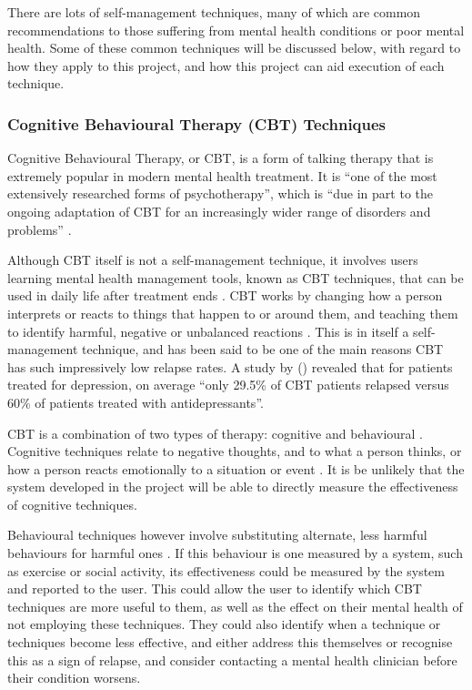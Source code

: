 \documentclass[11pt,openright,a4paper]{report}
\begin{document}
There are lots of self-management techniques, many of which are common recommendations to those suffering from mental health conditions or poor mental health. Some of these common techniques will be discussed below, with regard to how they apply to this project, and how this project can aid execution of each technique.

\subsubsection{Cognitive Behavioural Therapy (CBT) Techniques}
Cognitive Behavioural Therapy, or CBT, is a form of talking therapy that is extremely popular in modern mental health treatment. It is \enquote{one of the most extensively researched forms of psychotherapy}, which is \enquote{due in part to the ongoing adaptation of CBT for an increasingly
wider range of disorders and problems} \parencite{butler2006empirical}.

Although CBT itself is not a self-management technique, it involves users learning mental health management tools, known as CBT techniques, that can be used in daily life after treatment ends \parencite{babcpcbt}. CBT works by changing how a person interprets or reacts to things that happen to or around them, and teaching them to identify harmful, negative or unbalanced reactions \parencite{nhscbt}. This is in itself a self-management technique, and has been said to be one of the main reasons CBT has such impressively low relapse rates. A study by \citeauthor{butler2006empirical} (\citeyear{butler2006empirical}) revealed that for patients treated for depression, on average \enquote{only 29.5\% of CBT patients relapsed versus 60\% of patients treated with antidepressants}.

CBT is a combination of two types of therapy: cognitive and behavioural \parencite{patientcbt}. Cognitive techniques relate to negative thoughts, and to what a person thinks, or how a person reacts emotionally to a situation or event \parencite{medscapecbt}. It is be unlikely that the system developed in the project will be able to directly measure the effectiveness of cognitive techniques.

Behavioural techniques however involve substituting alternate, less harmful behaviours for harmful ones \parencite{patientcbt}. If this behaviour is one measured by a system, such as exercise or social activity, its effectiveness could be measured by the system and reported to the user. This could allow the user to identify which CBT techniques are more useful to them, as well as the effect on their mental health of not employing these techniques. They could also identify when a technique or techniques become less effective, and either address this themselves or recognise this as a sign of relapse, and consider contacting a mental health clinician before their condition worsens.
\end{document}
